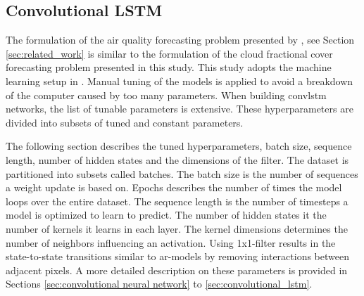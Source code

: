 \subsection{Convolutional LSTM}

The formulation of the air quality forecasting problem presented by \citeauthor{SunAirLSTM}, see Section \ref{sec:related_work} is similar to the formulation of the cloud fractional cover forecasting problem presented in this study. This study adopts the machine learning setup in . Manual tuning of the models is applied to avoid a breakdown of the computer caused by too many parameters. When building \acrshort{convlstm} networks, the list of tunable parameters is extensive. These hyperparameters are divided into subsets of tuned and constant parameters.

The following section describes the tuned hyperparameters, batch size, sequence length, number of hidden states and the dimensions of the filter. The dataset is partitioned into subsets called batches. The batch size is the number of sequences a weight update is based on. Epochs describes the number of times the model loops over the entire dataset. The sequence length is the number of timesteps a model is optimized to learn to predict. The number of hidden states it the number of kernels it learns in each layer. %
The kernel dimensions determines the number of neighbors influencing an activation. Using 1x1-filter results in the state-to-state transitions similar to \acrshort{ar}-models by removing interactions between adjacent pixels. A more detailed description on these parameters is provided in Sections \ref{sec:convolutional neural network} to \ref{sec:convolutional_lstm}. 

